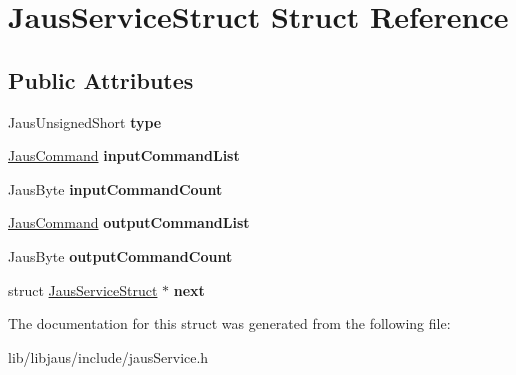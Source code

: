 \hypertarget{struct_jaus_service_struct}{\section{\-Jaus\-Service\-Struct \-Struct \-Reference}
\label{struct_jaus_service_struct}
}
\subsection*{\-Public \-Attributes}
\begin{DoxyCompactItemize}
\item 
\hypertarget{struct_jaus_service_struct_a125b0287b2e5babf090fb93d486a3ae8}{\-Jaus\-Unsigned\-Short {\bfseries type}}\label{struct_jaus_service_struct_a125b0287b2e5babf090fb93d486a3ae8}

\item 
\hypertarget{struct_jaus_service_struct_ac3a760a618ab71d88fcef0f01ae8346e}{\hyperlink{struct_jaus_command_struct}{\-Jaus\-Command} {\bfseries input\-Command\-List}}\label{struct_jaus_service_struct_ac3a760a618ab71d88fcef0f01ae8346e}

\item 
\hypertarget{struct_jaus_service_struct_abc287270a3110adbd003fb75b2b03456}{\-Jaus\-Byte {\bfseries input\-Command\-Count}}\label{struct_jaus_service_struct_abc287270a3110adbd003fb75b2b03456}

\item 
\hypertarget{struct_jaus_service_struct_a203332b6fdd5c86e3c5d15b8516a501d}{\hyperlink{struct_jaus_command_struct}{\-Jaus\-Command} {\bfseries output\-Command\-List}}\label{struct_jaus_service_struct_a203332b6fdd5c86e3c5d15b8516a501d}

\item 
\hypertarget{struct_jaus_service_struct_a644e7e8dd81301eea8cd21166a47cf9a}{\-Jaus\-Byte {\bfseries output\-Command\-Count}}\label{struct_jaus_service_struct_a644e7e8dd81301eea8cd21166a47cf9a}

\item 
\hypertarget{struct_jaus_service_struct_a652710799caef9e28f193722abfbeae9}{struct \hyperlink{struct_jaus_service_struct}{\-Jaus\-Service\-Struct} $\ast$ {\bfseries next}}\label{struct_jaus_service_struct_a652710799caef9e28f193722abfbeae9}

\end{DoxyCompactItemize}


\-The documentation for this struct was generated from the following file\-:\begin{DoxyCompactItemize}
\item 
lib/libjaus/include/jaus\-Service.\-h\end{DoxyCompactItemize}
